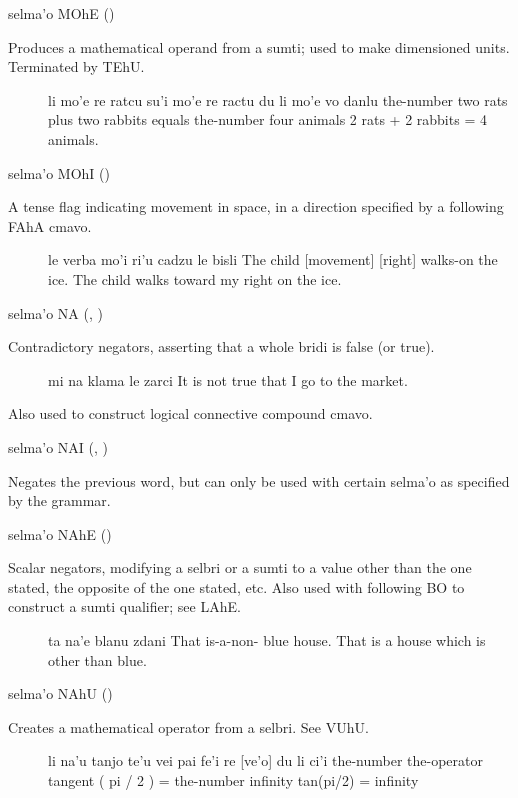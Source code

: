 selma'o MOhE () 

Produces a mathematical operand from a sumti; used to make
    dimensioned units. Terminated by TEhU.
\begin{description}
\item[] li mo'e re ratcu su'i mo'e re ractu du li mo'e vo danlu the-number two rats plus two rabbits equals the-number four animals 2 rats + 2 rabbits = 4 animals.
\end{description}

selma'o MOhI () 

A tense flag indicating movement in space, in a direction
    specified by a following FAhA cmavo.
\begin{description}
\item[] le verba mo'i ri'u cadzu le bisli The child [movement] [right] walks-on the ice. The child walks toward my right on the ice.
\end{description}

selma'o NA (, ) 

Contradictory negators, asserting that a whole bridi is
    false (or true).
\begin{description}
\item[] mi na klama le zarci It is not true that I go to the market.

\end{description}

Also used to construct logical connective compound
    cmavo.

selma'o NAI (, )

Negates the previous word, but can only be used with certain
    selma'o as specified by the grammar.

selma'o NAhE ()

Scalar negators, modifying a selbri or a sumti to a value
    other than the one stated, the opposite of the one stated, etc.
    Also used with following BO to construct a sumti qualifier; see
    LAhE.
\begin{description}
\item[] ta na'e blanu zdani That is-a-non- blue house. That is a house which is other than blue.
\end{description}

selma'o NAhU () 

Creates a mathematical operator from a selbri. See VUhU.
\begin{description}
\item[] li na'u tanjo te'u vei pai fe'i re [ve'o] du li ci'i the-number the-operator tangent ( pi / 2 ) = the-number infinity tan(pi/2) = infinity
\end{description}

